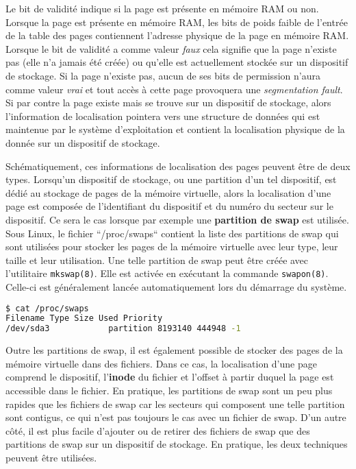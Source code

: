Le bit de validité indique si la page est présente en mémoire RAM ou
non. Lorsque la page est présente en mémoire RAM, les bits de poids
faible de l'entrée de la table des pages contiennent l'adresse physique
de la page en mémoire RAM. Lorsque le bit de validité a comme valeur
\textit{faux} cela signifie que la page n'existe pas (elle n'a
jamais été créée) ou qu'elle est actuellement stockée sur un dispositif
de stockage. Si la page n'existe pas, aucun de ses bits de permission
n'aura comme valeur \textit{vrai} et tout accès à cette page provoquera
une \textit{segmentation fault}. Si par contre la page existe mais se
trouve sur un dispositif de stockage, alors l'information de
localisation pointera vers une structure de données qui est maintenue
par le système d'exploitation et contient la localisation physique de la
donnée sur un dispositif de stockage.\newline

Schématiquement, ces informations de localisation des pages peuvent être
de deux types. Lorsqu'un dispositif de stockage, ou une partition d'un
tel dispositif, est dédié au stockage de pages de la mémoire virtuelle,
alors la localisation d'une page est composée de l'identifiant du
dispositif et du numéro du secteur sur le dispositif. Ce sera le cas
lorsque par exemple une \textbf{partition de swap} est utilisée. Sous
Linux, le fichier ``/proc/swaps`` contient la liste des partitions de
swap qui sont utilisées pour stocker les pages de la mémoire virtuelle
avec leur type, leur taille et leur utilisation. Une telle partition de
swap peut être créée avec l'utilitaire \verb#mkswap(8)#. Elle est
activée en exécutant la commande \verb#swapon(8)#. Celle-ci est
généralement lancée automatiquement lors du démarrage du
système.\newline

\begin{lstlisting}[language=bash]
$ cat /proc/swaps
Filename Type Size Used Priority
/dev/sda3            partition 8193140 444948 -1
\end{lstlisting}
 
Outre les partitions de swap, il est également possible de stocker des
pages de la mémoire virtuelle dans des fichiers. Dans ce cas, la
localisation d'une page comprend le dispositif, l'\textbf{inode} du
fichier et l'offset à partir duquel la page est accessible dans le
fichier. En pratique, les partitions de swap sont un peu plus rapides
que les fichiers de swap car les secteurs qui composent une telle
partition sont contigus, ce qui n'est pas toujours le cas avec un
fichier de swap. D'un autre côté, il est plus facile d'ajouter ou de
retirer des fichiers de swap que des partitions de swap sur un
dispositif de stockage. En pratique, les deux techniques peuvent être
utilisées.\newline
 
